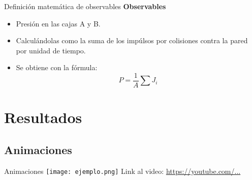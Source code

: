 \documentclass{beamer}
\begin{document}
\begin{frame}{Definición matemática de observables}
  \textbf{Observables}
  \begin{itemize}
    \item Presión en las cajas A y B.
    \item Calculándolas como la suma de los impúlsos por colisiones contra la pared por unidad de tiempo.
    \item Se obtiene con la fórmula:
      \begin{equation}
        P = \frac{1}{A} \sum J_i
      \end{equation}
  \end{itemize}
\end{frame}

\section{Resultados}
\subsection{Animaciones}
\begin{frame}{Animaciones}
  \texttt{[image: ejemplo.png]}
  \vspace{0.3cm}
  \footnotesize Link al video: \url{https://youtube.com/...}
\end{frame}
\end{document}
